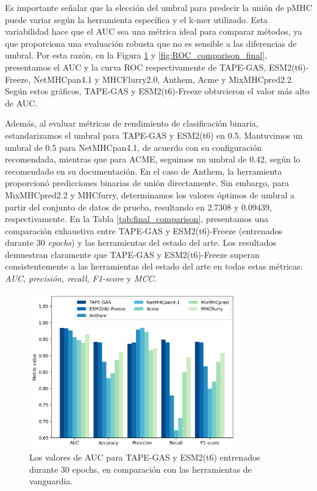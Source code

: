 Es importante señalar que la elección del umbral para predecir la unión de pMHC puede variar según la herramienta específica y el k-mer utilizado. Esta variabilidad hace que el AUC sea una métrica ideal para comparar métodos, ya que proporciona una evaluación robusta que no es sensible a las diferencias de umbral. Por esta razón, en la Figura \ref{fig:comparison_final} y \ref{fig:ROC_comparison_final}, presentamos el AUC y la curva ROC respectivamente de TAPE-GAS, ESM2(t6)-Freeze, NetMHCpan4.1 y MHCFlurry2.0, Anthem, Acme y MixMHCpred2.2. Según estos gráficos, TAPE-GAS y ESM2(t6)-Freeze obtuvieron el valor más alto de AUC.

Además, al evaluar métricas de rendimiento de clasificación binaria, estandarizamos el umbral para TAPE-GAS y ESM2(t6) en 0.5. Mantuvimos un umbral de 0.5 para NetMHCpan4.1, de acuerdo con su configuración recomendada, mientras que para ACME, seguimos un umbral de 0.42, según lo recomendado en su documentación. En el caso de Anthem, la herramienta proporcionó predicciones binarias de unión directamente. Sin embargo, para MixMHCpred2.2 y MHCfurry, determinamos los valores óptimos de umbral a partir del conjunto de datos de prueba, resultando en 2.7308 y 0.09439, respectivamente. En la Tabla \ref{tab:final_comparison}, presentamos una comparación exhaustiva entre TAPE-GAS y ESM2(t6)-Freeze (entrenados durante 30 \textit{epochs}) y las herramientas del estado del arte. Los resultados demuestran claramente que TAPE-GAS y ESM2(t6)-Freeze superan consistentemente a las herramientas del estado del arte en todas estas métricas: \textit{AUC, precisión, recall, F1-score} y \textit{MCC}.

\begin{figure}
	\centering
	\includegraphics[width=0.8\textwidth]{img/results/metrics_comparison}
	\caption[Comparación del AUC con métodos del estado del arte]{Los valores de AUC para TAPE-GAS y ESM2(t6) entrenados durante 30 epochs, en comparación con las herramientas de vanguardia.}
	\label{fig:comparison_final}
\end{figure}

